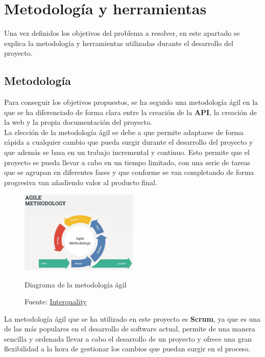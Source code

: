 \section{Metodología y herramientas}\label{sec:metodologia-y-herramientas-de-seguimiento}

Una vez definidos los objetivos del problema a resolver, en este apartado se explica la metodología y herramientas
utilizadas durante el desarrollo del proyecto.

\subsection{Metodología}\label{subsec:metodologia}

Para conseguir los objetivos propuestos, se ha seguido una metodología ágil en la que se ha diferenciado de forma
clara entre la creación de la \textbf{API}, la creación de la web y la propia documentación del proyecto. \\

La elección de la metodología ágil se debe a que permite adaptarse de forma rápida a cualquier cambio que pueda
surgir durante el desarrollo del proyecto y que además se basa en un trabajo incremental y continuo. Esto permite
que el proyecto se pueda llevar a cabo en un tiempo limitado, con una serie de tareas que se agrupan en
diferentes fases y que conforme se van completando de forma progresiva van añadiendo valor al producto final. \\

\begin{figure}[H]
\centering
\includegraphics[width=0.5\textwidth]{imgs/metodologia_agil.jpg}
    \caption{Diagrama de la metodología ágil}
    \label{fig:metodologia_agil}
    \caption*{Fuente: \href{https://interqualitybg.com/en/resources/scrum-and-agile-resources/agile-methodology}{Interquality}}
\end{figure}

La metodología ágil que se ha utilizado en este proyecto es \textbf{Scrum}, ya que es una de las más populares en el
desarrollo de software actual, permite de una manera sencilla y ordenada llevar a cabo el desarrollo de un proyecto y
ofrece una gran flexibilidad a la hora de gestionar los cambios que puedan surgir en el proceso. \\

